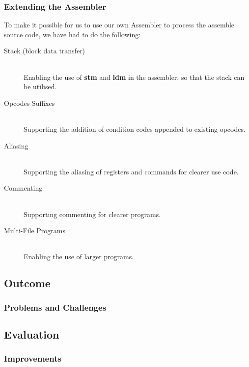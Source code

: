 \documentclass{beamer}
\begin{document}
\begin{frame}
\frametitle{Extending the Assembler}
To make it possible for us to use our own Assembler to process the assemble source code, we have had to do the following:
\begin{description}

\item[Stack (block data transfer)]\hfill\\
	\small Enabling the use of \textbf{stm} and \textbf{ldm} in the assembler, so that the stack can be utilised.
	
\item[Opcodes Suffixes]\hfill\\
	Supporting the addition of condition codes appended to existing opcodes.

\item[Aliasing]\hfill\\
	Supporting the aliasing of registers and commands for clearer use code.
		
\item[Commenting]\hfill\\
	Supporting commenting for clearer programs.

\item[Multi-File Programs]\hfill\\
	Enabling the use of larger programs.

\end{description}
\end{frame}
\subsection{Outcome}

\begin{frame}
\frametitle{Problems and Challenges}





\end{frame}


\subsection{Evaluation}

\begin{frame}
\frametitle{Improvements}





\end{frame}
\end{document}
